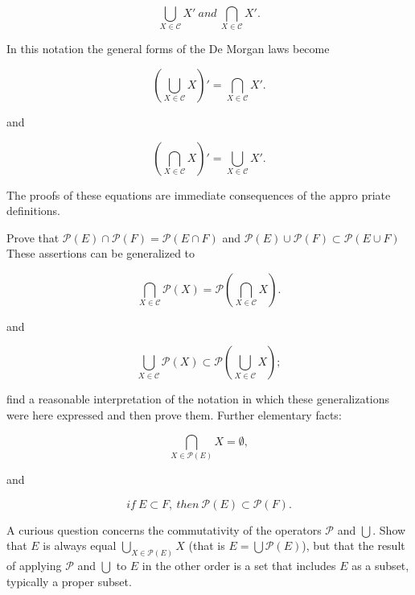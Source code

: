 \begin{equation*}
\bigcup_{X \in \mathcal{C}} X' \: and \: \bigcap_{X \in \mathcal{C}} X' .
\end{equation*}

In this notation the general forms of the De Morgan laws become 

\begin{equation*}
( \bigcup_{X \in \mathcal{C}} X)' = \bigcap_{X \in \mathcal{C}} X' .
\end{equation*}

and 

\begin{equation*}
( \bigcap_{X \in \mathcal{C}} X)' = \bigcup_{X \in \mathcal{C}} X' .
\end{equation*}

The proofs of these equations are immediate consequences of the appro priate definitions. 

\begin{named}[EXERCISE.  ] Prove that $ \mathcal{P} (E) \cap \mathcal{P} (F) = \mathcal{P}(E \cap F) $ and $ \mathcal{P} (E) \cup \mathcal{P} (F) \subset \mathcal{P}(E \cup F) $ These assertions can be generalized to 

\begin{equation*}
\bigcap_{X \in \mathcal{C}} \mathcal{P} (X) = \mathcal{P} ( \bigcap_{X \in \mathcal{C}} X) .
\end{equation*}

and

\begin{equation*}
\bigcup_{X \in \mathcal{C}} \mathcal{P} (X) \subset \mathcal{P} ( \bigcup_{X \in \mathcal{C}} X) ;
\end{equation*}

find a reasonable interpretation of the notation in which these generalizations were here expressed and then prove them. Further  elementary facts: 

\begin{equation*}
\bigcap_{X \in \mathcal{P} (E)} X = \emptyset ,
\end{equation*}

and 

\begin{equation*}
if \: E \subset F , \: then \: \mathcal{P} (E) \subset \mathcal{P} (F).
\end{equation*}

A curious question concerns the commutativity of the operators $ \mathcal{P} $ and $ \bigcup $. Show that $E$ is always equal $\bigcup_{X \in \mathcal{P} (E)} X $ (that is $ E = \bigcup \mathcal{P} (E) $), but that the result of applying $\mathcal{P} $ and $ \bigcup $ to $E$ in the other order is a set that includes $E$ as a subset, typically a proper subset.
\end{named}
